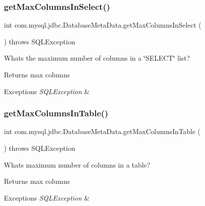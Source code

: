 \subsubsection{\texorpdfstring{get\+Max\+Columns\+In\+Select()}{getMaxColumnsInSelect()}}
{\footnotesize\ttfamily int com.\+mysql.\+jdbc.\+Database\+Meta\+Data.\+get\+Max\+Columns\+In\+Select (\begin{DoxyParamCaption}{ }\end{DoxyParamCaption}) throws S\+Q\+L\+Exception}

What\textquotesingle{}s the maximum number of columns in a \char`\"{}\+S\+E\+L\+E\+C\+T\char`\"{} list?

\begin{DoxyReturn}{Returns}
max columns 
\end{DoxyReturn}

\begin{DoxyExceptions}{Exceptions}
{\em S\+Q\+L\+Exception} & \\
\hline
\end{DoxyExceptions}
\mbox{\label{classcom_1_1mysql_1_1jdbc_1_1_database_meta_data_aaa5af70bb61c9992facf7c5c0eadca7c}} 
\subsubsection{\texorpdfstring{get\+Max\+Columns\+In\+Table()}{getMaxColumnsInTable()}}
{\footnotesize\ttfamily int com.\+mysql.\+jdbc.\+Database\+Meta\+Data.\+get\+Max\+Columns\+In\+Table (\begin{DoxyParamCaption}{ }\end{DoxyParamCaption}) throws S\+Q\+L\+Exception}

What\textquotesingle{}s maximum number of columns in a table?

\begin{DoxyReturn}{Returns}
max columns 
\end{DoxyReturn}

\begin{DoxyExceptions}{Exceptions}
{\em S\+Q\+L\+Exception} & \\
\hline
\end{DoxyExceptions}
\mbox{\label{classcom_1_1mysql_1_1jdbc_1_1_database_meta_data_a4e70ed7b720c2054d2854ff492b77de8}} 
